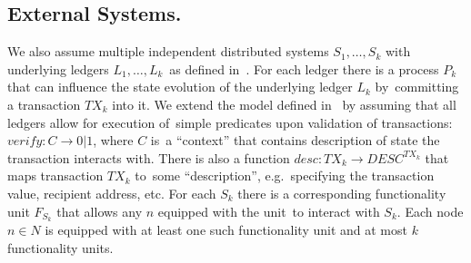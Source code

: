 \subsection{External Systems.}\label{subsec:external-systems.}
We also assume multiple independent distributed systems ${S_1, \dots, S_k}$ with underlying ledgers ${L_1, \dots, L_k}$\
as defined in~\cite{cryptoeprint:2019/1128}.
For each ledger there is a process $P_k$ that can influence the state evolution of the underlying ledger $L_k$ by\
committing a transaction $TX_k$ into it.
We extend the model defined in~\cite{cryptoeprint:2019/1128} by assuming that all ledgers allow for execution of\
simple predicates upon validation of transactions: ${verify: C \rightarrow 0 | 1}$, where $C$ is\
a \enquote{context} that contains description of state the transaction interacts with.
There is also a function ${desc: TX_k \rightarrow DESC^{TX_k}}$ that maps transaction $TX_k$ to\
some \enquote{description}, e.g.\ specifying the transaction value, recipient address, etc.
For each  $S_k$ there is a corresponding functionality unit $F_{S_k}$ that allows any $n$ equipped with the unit\
to interact with $S_k$.
Each node $n \in N$ is equipped with at least one such functionality unit and at most $k$ functionality units.